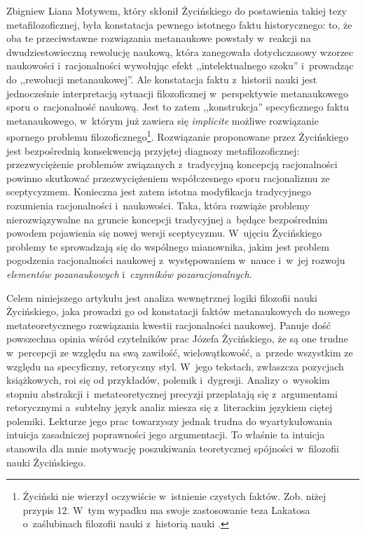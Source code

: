 \begin{artplenv}{Zbigniew Liana}
Motywem, który skłonił Życińskiego do postawienia takiej tezy metafilozoficznej, była konstatacja pewnego istotnego
faktu historycznego: to, że oba te przeciwstawne rozwiązania metanaukowe powstały w~reakcji na dwudziestowieczną
rewolucję naukową, która zanegowała dotychczasowy wzorzec naukowości i~racjonalności wywołując efekt ,,intelektualnego
szoku'' i~prowadząc do ,,rewolucji metanaukowej''. Ale konstatacja faktu z~historii nauki jest jednocześnie interpretacją
sytuacji filozoficznej w~perspektywie metanaukowego sporu o~racjonalność naukową. Jest to zatem ,,konstrukcja''
specyficznego faktu metanaukowego, w~którym już zawiera się \textit{implicite} możliwe rozwiązanie spornego problemu
filozoficznego\footnote{Życiński nie wierzył oczywiście w~istnienie czystych faktów. Zob. niżej przypis 12. W~tym
wypadku ma swoje zastosowanie teza Lakatosa o~zaślubinach filozofii nauki z~historią nauki
\parencites[zob.][s.~121n]{zycinski_jezyk_1983}[s.~26]{zycinski_structure_1988}[s.~47]{zycinski_struktura_2013}.
}. Rozwiązanie proponowane przez
Życińskiego jest bezpośrednią konsekwencją przyjętej diagnozy metafilozoficznej: przezwyciężenie problemów związanych z~tradycyjną
koncepcją racjonalności powinno skutkować przezwyciężeniem współczesnego sporu racjonalizmu ze sceptycyzmem.
Konieczna jest zatem istotna modyfikacja tradycyjnego rozumienia racjonalności i~naukowości. Taka, która rozwiąże
problemy nierozwiązywalne na gruncie koncepcji tradycyjnej a~będące bezpośrednim powodem pojawienia się nowej wersji
sceptycyzmu. W~ujęciu Życińskiego problemy te sprowadzają się do wspólnego mianownika, jakim jest problem pogodzenia
racjonalności naukowej z~występowaniem w~nauce i~w~jej rozwoju \textit{elementów pozanaukowych} i~\textit{czynników
pozaracjonalnych}.

Celem niniejszego artykułu jest analiza wewnętrznej logiki filozofii nauki Życińskiego, jaka prowadzi go od konstatacji
faktów metanaukowych do nowego metateoretycznego rozwiązania kwestii racjonalności naukowej. Panuje dość powszechna
opinia wśród czytelników prac Józefa Życińskiego, że są one trudne w~percepcji ze względu na swą zawiłość,
wielowątkowość, a~przede wszystkim ze względu na specyficzny, retoryczny styl. W~jego tekstach, zwłaszcza pozycjach
książkowych, roi się od przykładów, polemik i~dygresji. Analizy o~wysokim stopniu abstrakcji i~metateoretycznej
precyzji przeplatają się z~argumentami retorycznymi a~subtelny język analiz miesza się z~literackim językiem ciętej
polemiki. Lekturze jego prac towarzyszy jednak trudna do wyartykułowania intuicja zasadniczej poprawności jego
argumentacji. To właśnie ta intuicja stanowiła dla mnie motywację poszukiwania teoretycznej spójności w~filozofii nauki
Życińskiego.


\end{artplenv}
